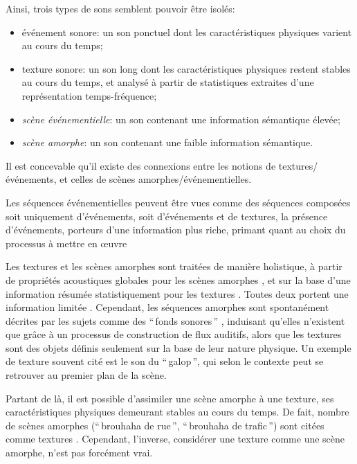 Ainsi, trois types de sons semblent pouvoir être isolés:

\begin{itemize}
\item {événement sonore}: un son ponctuel dont les caractéristiques physiques varient au cours du temps;
\item {texture sonore}: un son long dont les caractéristiques physiques restent stables au cours du temps, et analysé à partir de statistiques extraites d'une représentation temps-fréquence;
\item \emph{scène événementielle}: un son contenant une information sémantique élevée;
\item \emph{scène amorphe}: un son contenant une faible information sémantique.
\end{itemize}

Il est concevable qu'il existe des connexions entre les notions de textures/événements, et celles de scènes amorphes/événementielles.

Les séquences événementielles peuvent être vues comme des séquences composées soit uniquement d'événements, soit d'événements et de textures, la présence d'événements, porteurs d'une information plus riche, primant quant au choix du processus à mettre en œuvre

Les textures et les scènes amorphes sont traitées de manière holistique, à partir de propriétés acoustiques globales pour les scènes amorphes \citep{dubois2006cognitive,maffiolo_caracterisation_1999}, et sur la base d'une information résumée statistiquement pour les textures \citep{mcdermott2013summary}. Toutes deux portent une information limitée \citep{saint1995classification,nelken2013ear}. Cependant, les séquences amorphes sont spontanément décrites par les sujets comme des ``\,fonds sonores\,'' \citep{maffiolo_caracterisation_1999,guastavino2006ideal}, induisant qu'elles n'existent que grâce à un processus de construction de flux auditifs, alors que les textures sont des objets définis seulement sur la base de leur nature physique. Un exemple de texture souvent cité est le son du ``\,galop\,'', qui selon le contexte peut se retrouver au premier plan de la scène. 

Partant de là, il est possible d'assimiler une scène amorphe à une texture, ses caractéristiques physiques demeurant stables au cours du temps. De fait, nombre de scènes amorphes (``\,brouhaha de rue\,'', ``\,brouhaha de trafic\,'') sont citées comme textures . Cependant, l'inverse, considérer une texture comme une scène amorphe, n'est pas forcément vrai.
 
